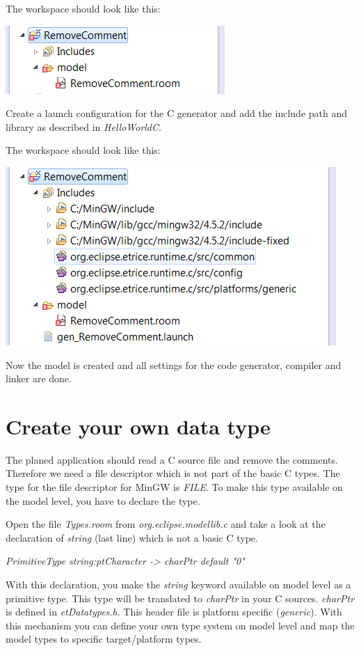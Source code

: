 The workspace should look like this:

\includegraphics{images/036-RemoveCommentC01.png}

Create a launch configuration for the C generator and add the include path and library as described in \textit{HelloWorldC}.

The workspace should look like this:

\includegraphics{images/036-RemoveCommentC02.png}

Now the model is created and all settings for the code generator, compiler and linker are done.


\section{Create your own data type}

The planed application should read a C source file and remove the comments. Therefore we need a file descriptor which is not part of the basic C types. The type for the file descriptor for MinGW is \textit{FILE}. To make this type available on the model level, you have to declare the type. 

Open the file \textit{Types.room} from \textit{org.eclipse.modellib.c} and take a look at the declaration of \textit{string} (last line) which is not a basic C type.

\textit{PrimitiveType string:ptCharacter -> charPtr default "0"}

With this declaration, you make the \textit{string} keyword available on model level as a primitive type. This type will be translated to \textit{charPtr} in your C sources. \textit{charPtr} is defined in \textit{etDatatypes.h}. This header file is platform specific (\textit{generic}). With this mechanism you can define your own type system on model level and map the model types to specific target/platform types. 

